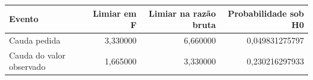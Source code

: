 \begin{tabular}{lrrr}
\toprule
Evento & Limiar em F & Limiar na razão bruta & Probabilidade sob H0 \\
\midrule
Cauda pedida & 3,330000 & 6,660000 & 0,049831275797 \\
Cauda do valor observado & 1,665000 & 3,330000 & 0,230216297933 \\
\bottomrule
\end{tabular}
